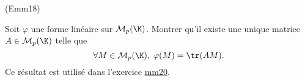 \begin{tiny}(Emm18)\end{tiny} Soit $\varphi$ une forme linéaire sur $\mathcal{M}_p(\K)$. Montrer qu'il existe une unique matrice $A\in \mathcal{M}_p(\K)$ telle que 
\begin{displaymath}
  \forall M \in \mathcal{M}_p(\K),\; \varphi(M) = \tr(AM).
\end{displaymath}
Ce résultat est utilisé dans l'exercice \href{\exosurl _fex_mo.pdf}{mm20}.
